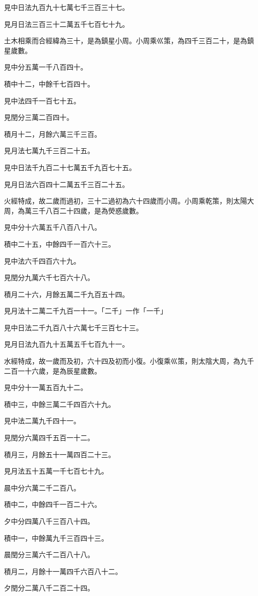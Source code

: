 \begin{pinyinscope}
見中日法九百九十七萬七千三百三十七。

見月日法三百三十二萬五千七百七十九。

土木相乘而合經緯為三十，是為鎮星小周。小周乘巛策，為四千三百二十，是為鎮星歲數。

見中分五萬一千八百四十。

積中十二，中餘千七百四十。

見中法四千一百七十五。

見閏分三萬二百四十。

積月十二，月餘六萬三千三百。

見月法七萬九千三百二十五。

見中日法千九百二十七萬五千九百七十五。

見月日法六百四十二萬五千三百二十五。

火經特成，故二歲而過初，三十二過初為六十四歲而小周。小周乘乾策，則太陽大周，為萬三千八百二十四歲，是為熒惑歲數。

見中分十六萬五千八百八十八。

積中二十五，中餘四千一百六十三。

見中法六千四百六十九。

見閏分九萬六千七百六十八。

積月二十六，月餘五萬二千九百五十四。

見月法十二萬二千九百一十一。「二千」一作「一千」

見中日法二千九百八十六萬七千三百七十三。

見月日法九百九十五萬五千七百九十一。

水經特成，故一歲而及初，六十四及初而小復。小復乘巛策，則太陰大周，為九千二百一十六歲，是為辰星歲數。

見中分十一萬五百九十二。

積中三，中餘三萬二千四百六十九。

見中法二萬九千四十一。

見閏分六萬四千五百一十二。

積月三，月餘五十一萬四百二十三。

見月法五十五萬一千七百七十九。

晨中分六萬二千二百八。

積中二，中餘四千一百二十六。

夕中分四萬八千三百八十四。

積中一，中餘萬九千三百四十三。

晨閏分三萬六千二百八十八。

積月二，月餘十一萬四千六百八十二。

夕閏分二萬八千二百二十四。


\end{pinyinscope}
